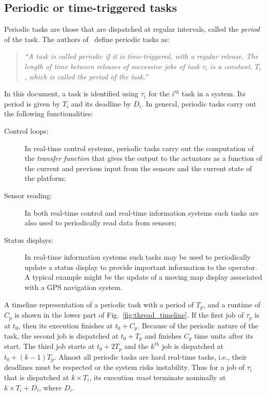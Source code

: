 \subsection{Periodic or time-triggered tasks}
Periodic tasks are those that are dispatched at regular intervals,
called the \emph{period} of the task. The authors of~\cite{sha@rts04}
define periodic tasks as:

\begin{quote}
 \emph{``A task is called periodic if it is time-triggered, with a
   regular release. The length of time between releases of successive
   jobs of task $\tau_i$ is a constant, $T_i$, which is called the
   period of the task.''} 
\end{quote}

In this document, a task is identified using $\tau_i$ for the $i^{th}$
task in a system. Its period is given by $T_i$ and its deadline by
$D_i$. In general, periodic tasks carry out the following
functionalities:

\begin{description}
\item[Control loops:]{In real-time control systems, periodic tasks
  carry out the computation of the \emph{transfer function} that gives
  the output to the actuators as a function of the current and
  previous input from the sensors and the current state of the
  platform;}
\item[Sensor reading:]{In both real-time control and real-time
  information systems such tasks are also used to periodically read
  data from sensors;}
\item[Status displays:]{In real-time information systems such tasks may
  be used to periodically update a status display to provide important
  information to the operator. A typical example might be the update
  of a moving map display associated with a GPS navigation system.}
\end{description}

A timeline representation of a periodic task with a period of $T_p$,
and a runtime of $C_p$ is shown in the lower part of
Fig.~\ref{fig:thread_timeline}. If the first job of $\tau_p$ is at
$t_0$, then its execution finishes at $t_0 + C_p$. Because of the
periodic nature of the task, the second job is dispatched at $t_0 +
T_p$ and finishes $C_p$ time units after its start. The third job
starts at $t_0 + 2T_p$ and the $k^{th}$ job is dispatched at $t_0 +
(k-1)T_p$. Almost all periodic tasks are hard real-time tasks, i.e.,
their deadlines must be respected or the system risks
instability. Thus for a job of $\tau_i$ that is dispatched at $k\times
T_i$, its execution \emph{must} terminate nominally at $k\times T_i +
D_i$, where $D_i$.

